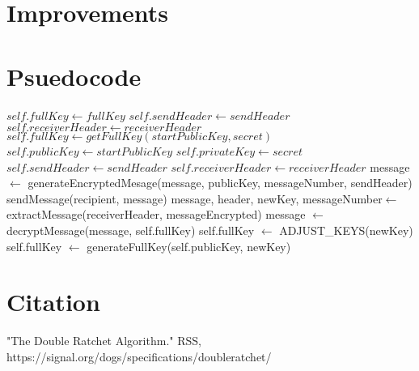 \documentclass{article}
\begin{document}
 \section{Improvements}
\section{Psuedocode}

    \begin{algorithm}
    \begin{algorithmic}
		\State $self.fullKey \gets fullKey$
		\State $self.sendHeader \gets sendHeader$
		\State $self.receiverHeader \gets receiverHeader$
	\EndProcedure
		\State $self.fullKey \gets getFullKey(startPublicKey, secret)$
		\State $self.publicKey \gets startPublicKey$
		\State $self.privateKey \gets secret$
		\State $self.sendHeader \gets sendHeader$
		\State $self.receiverHeader \gets receiverHeader$
	\EndProcedure
		\State message $\gets$ generateEncryptedMesage(message, publicKey, messageNumber, sendHeader) 
		\State sendMessage(recipient, message)
	\EndProcedure
		\State message, header, newKey, messageNumber$\gets$ extractMessage(receiverHeader, messageEncrypted)
		\State message $\gets$ decryptMessage(message, self.fullKey) 
		\State self.fullKey $\gets$ ADJUST\_KEYS(newKey)
	\EndProcedure
		\State self.fullKey $\gets$ generateFullKey(self.publicKey, newKey)
	\EndProcedure
    	\end{algorithmic}
    \end{algorithm}

\section{Citation}

"The Double Ratchet Algorithm." RSS, https://signal.org/dogs/specifications/doubleratchet/


    
	
	    
\end{document}
